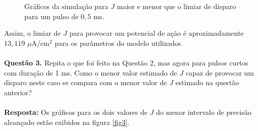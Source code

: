 \documentclass[english,11pt,a4paper]{article}
\begin{document}
\begin{figure}[H]
\begin{minipage}{0.49\textwidth}
			\captionsetup{justification=centering, labelformat=empty}
			\label{fig:fig22}
		\end{minipage}
		\caption{Gráficos da simulação para $J$ maior e menor que o limiar de disparo para um pulso de $0,5$ ms.}
		\label{fig2}
	\end{figure}
	
	Assim, o limiar de $J$ para provocar um potencial de ação é aproximadamente $13,119$ $\mu$A/cm$^2$ para os parâmetros do modelo utilizados.\\\\
	
	\noindent \textbf{Questão 3.} Repita o que foi feito na Questão 2, mas agora para pulsos curtos com duração de 1 ms. Como o menor valor estimado de $J$ capaz de provocar um disparo neste caso se compara com o menor valor de $J$ estimado na questão anterior?\\\\
	
	\noindent\textbf{Resposta:} Os gráficos para os dois valores de $J$ do menor intervalo de precisão alcançado estão exibidos na figura \ref{fig3}.
	
\end{document}
